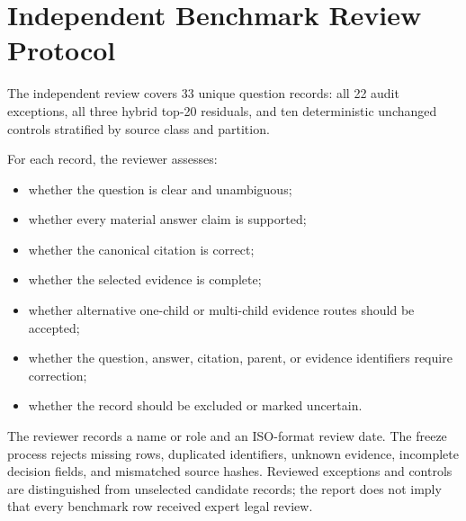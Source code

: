 \chapter[Independent Benchmark Review Protocol]{Independent Benchmark Review\\Protocol}
\label{app:review-protocol}

The independent review covers 33 unique question records: all 22 audit exceptions, all three hybrid top-20 residuals, and ten deterministic unchanged controls stratified by source class and partition.

For each record, the reviewer assesses:

\begin{itemize}
  \item whether the question is clear and unambiguous;
  \item whether every material answer claim is supported;
  \item whether the canonical citation is correct;
  \item whether the selected evidence is complete;
  \item whether alternative one-child or multi-child evidence routes should be accepted;
  \item whether the question, answer, citation, parent, or evidence identifiers require correction;
  \item whether the record should be excluded or marked uncertain.
\end{itemize}

The reviewer records a name or role and an ISO-format review date. The freeze process rejects missing rows, duplicated identifiers, unknown evidence, incomplete decision fields, and mismatched source hashes. Reviewed exceptions and controls are distinguished from unselected candidate records; the report does not imply that every benchmark row received expert legal review.

